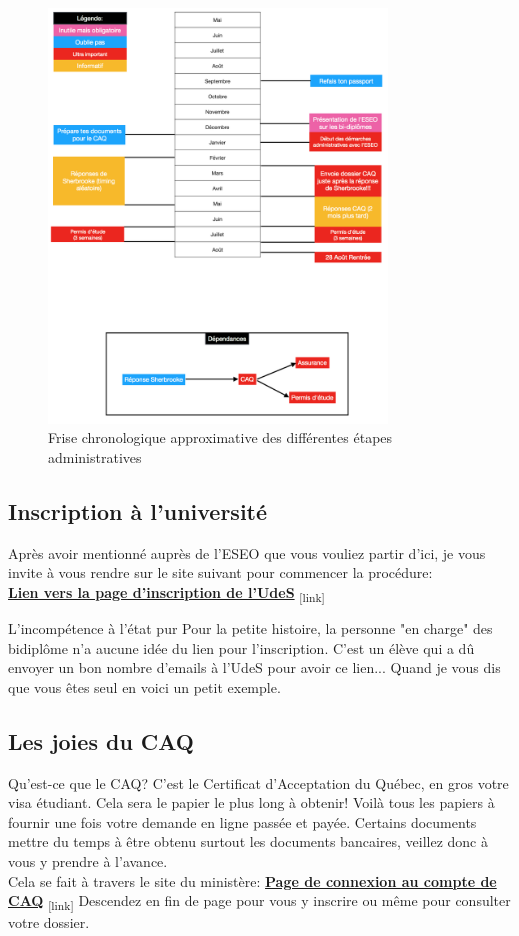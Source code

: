 \begin{figure}[h!]
\centering
\includegraphics[width = 90mm]{figures/Chrono_Sherbrooke}
\caption{Frise chronologique approximative des différentes étapes administratives}
\end{figure}

\subsection{Inscription à l'université}\label{sec:sec3.2.2}
Après avoir mentionné auprès de l'ESEO que vous vouliez partir d'ici, je vous invite à vous rendre sur le site suivant pour commencer la procédure: \\
\href{https://www.usherbrooke.ca/helios/lib880/infoadm/cw/wda1/CLW301F1}{\textbf{Lien vers la page d'inscription de l'UdeS}}\textsubscript{  [link]}


\begin{example}{L'incompétence à l'état pur}
  Pour la petite histoire, la personne "en charge" des bidiplôme n'a aucune idée du lien pour l'inscription. C'est un élève qui a dû envoyer un bon nombre d'emails à l'UdeS pour avoir ce lien... Quand je vous dis que vous êtes seul en voici un petit exemple.
\end{example}


\subsection{Les joies du CAQ}\label{sec:sec3.2.3}
Qu'est-ce que le CAQ? C'est le Certificat d'Acceptation du Québec, en gros votre visa étudiant. Cela sera le papier le plus long à obtenir!
Voilà tous les papiers à fournir une fois votre demande en ligne passée et payée. Certains documents mettre du temps à être obtenu surtout les documents bancaires, veillez donc à vous y prendre à l'avance. \\
Cela se fait à travers le site du ministère:
\bigbreak
\href{http://www.immigration-quebec.gouv.qc.ca/fr/services/caq-electronique/index.html}{\textbf{Page de connexion au compte de CAQ}}\textsubscript{  [link]}
\bigbreak
Descendez en fin de page pour vous y inscrire ou même pour consulter votre dossier.

